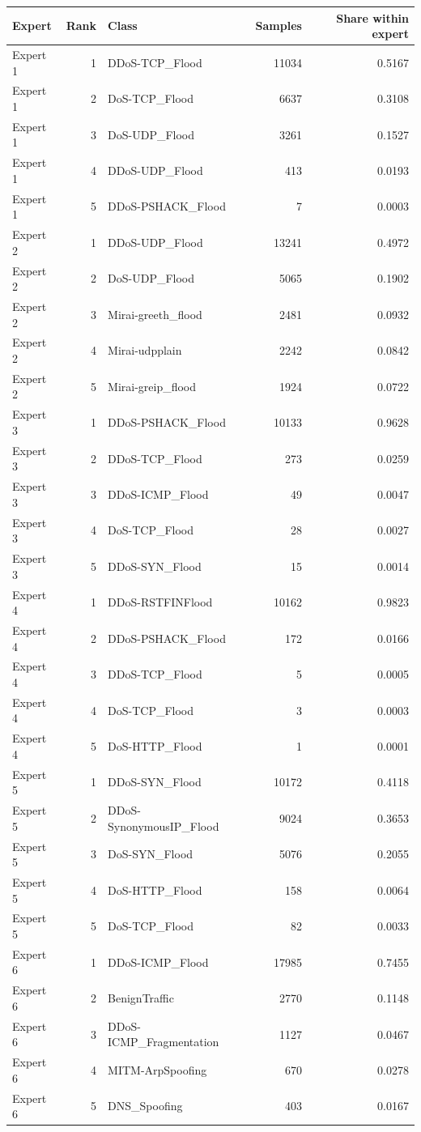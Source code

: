 \begin{tabular}{lrlrr}
\toprule
Expert & Rank & Class & Samples & Share within expert \\
\midrule
Expert 1 & 1 & DDoS-TCP\_Flood & 11034 & 0.5167 \\
Expert 1 & 2 & DoS-TCP\_Flood & 6637 & 0.3108 \\
Expert 1 & 3 & DoS-UDP\_Flood & 3261 & 0.1527 \\
Expert 1 & 4 & DDoS-UDP\_Flood & 413 & 0.0193 \\
Expert 1 & 5 & DDoS-PSHACK\_Flood & 7 & 0.0003 \\
Expert 2 & 1 & DDoS-UDP\_Flood & 13241 & 0.4972 \\
Expert 2 & 2 & DoS-UDP\_Flood & 5065 & 0.1902 \\
Expert 2 & 3 & Mirai-greeth\_flood & 2481 & 0.0932 \\
Expert 2 & 4 & Mirai-udpplain & 2242 & 0.0842 \\
Expert 2 & 5 & Mirai-greip\_flood & 1924 & 0.0722 \\
Expert 3 & 1 & DDoS-PSHACK\_Flood & 10133 & 0.9628 \\
Expert 3 & 2 & DDoS-TCP\_Flood & 273 & 0.0259 \\
Expert 3 & 3 & DDoS-ICMP\_Flood & 49 & 0.0047 \\
Expert 3 & 4 & DoS-TCP\_Flood & 28 & 0.0027 \\
Expert 3 & 5 & DDoS-SYN\_Flood & 15 & 0.0014 \\
Expert 4 & 1 & DDoS-RSTFINFlood & 10162 & 0.9823 \\
Expert 4 & 2 & DDoS-PSHACK\_Flood & 172 & 0.0166 \\
Expert 4 & 3 & DDoS-TCP\_Flood & 5 & 0.0005 \\
Expert 4 & 4 & DoS-TCP\_Flood & 3 & 0.0003 \\
Expert 4 & 5 & DoS-HTTP\_Flood & 1 & 0.0001 \\
Expert 5 & 1 & DDoS-SYN\_Flood & 10172 & 0.4118 \\
Expert 5 & 2 & DDoS-SynonymousIP\_Flood & 9024 & 0.3653 \\
Expert 5 & 3 & DoS-SYN\_Flood & 5076 & 0.2055 \\
Expert 5 & 4 & DoS-HTTP\_Flood & 158 & 0.0064 \\
Expert 5 & 5 & DoS-TCP\_Flood & 82 & 0.0033 \\
Expert 6 & 1 & DDoS-ICMP\_Flood & 17985 & 0.7455 \\
Expert 6 & 2 & BenignTraffic & 2770 & 0.1148 \\
Expert 6 & 3 & DDoS-ICMP\_Fragmentation & 1127 & 0.0467 \\
Expert 6 & 4 & MITM-ArpSpoofing & 670 & 0.0278 \\
Expert 6 & 5 & DNS\_Spoofing & 403 & 0.0167 \\
\bottomrule
\end{tabular}
